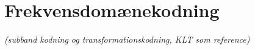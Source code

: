 \newpage
\section{Frekvensdomænekodning}
\textit{(subband kodning og transformationskodning, KLT som reference)}
